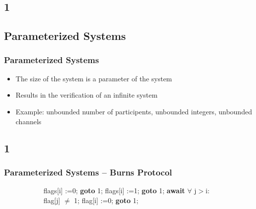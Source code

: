 \documentclass[handout]{beamer}
\begin{document}
\subsection*{1}
\subsection{Parameterized Systems}
\begin{frame}
  \frametitle{Parameterized Systems}
  \begin{itemize}
  \item
    The size of the system is a parameter of the system
  \item
    Results in the verification of an infinite system %
  \item
    Example: unbounded number of participents, unbounded integers, unbounded channels
  \end{itemize}
\end{frame}

\subsection*{1}
\begin{frame}
  \frametitle{Parameterized Systems -- Burns Protocol}
  \begin{figure}
    \begin{example}
      \begin{subfigure}[b]{0.49\textwidth}
        \begin{algorithmic}
          \footnotesize
          \State flags[i] :=0;
           \State \textbf{goto} 1;
          \EndIf
          \State flags[i] :=1;
           \State \textbf{goto} 1;
          \EndIf
          \State \textbf{await} $\forall$ j$>$i: flag[j] $\neq$ 1;
          \State flag[i] :=0; \textbf{goto} 1;
        \end{algorithmic}
      \end{subfigure}
      \begin{subfigure}[b]{0.49\textwidth}
        \burns
      \end{subfigure}
    \end{example}
  \end{figure}
\end{frame}
\end{document}
